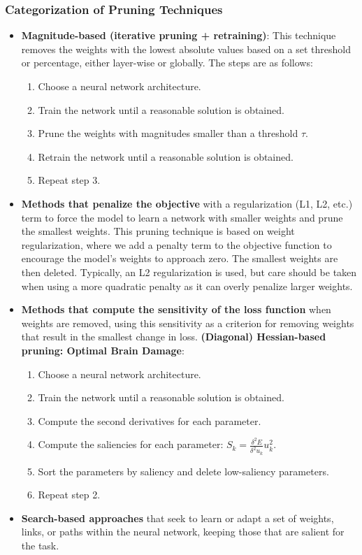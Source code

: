 \subsubsection{Categorization of Pruning Techniques}
\begin{itemize}
    \item \textbf{Magnitude-based (iterative pruning + retraining)}: This technique
          removes the weights with the lowest absolute values based on a set
          threshold or percentage, either layer-wise or globally. The steps are
          as follows:
          \begin{enumerate}
              \item Choose a neural network architecture.
              \item Train the network until a reasonable solution is obtained.
              \item Prune the weights with magnitudes smaller than a threshold $\tau$.
              \item Retrain the network until a reasonable solution is obtained.
              \item Repeat step 3.
          \end{enumerate}
    \item \textbf{Methods that penalize the objective} with a regularization
          (L1, L2, etc.) term to force the model to learn a network with smaller
          weights and prune the smallest weights. This pruning technique is based
          on weight regularization, where we add a penalty term to the objective
          function to encourage the model's weights to approach zero. The smallest
          weights are then deleted. Typically, an L2 regularization is used, but
          care should be taken when using a more quadratic penalty as it can overly
          penalize larger weights.
    \item \textbf{Methods that compute the sensitivity of the loss function} when
          weights are removed, using this sensitivity as a criterion for removing
          weights that result in the smallest change in loss. \textbf{(Diagonal)
              Hessian-based pruning: Optimal Brain Damage}:
          \begin{enumerate}
              \item Choose a neural network architecture.
              \item Train the network until a reasonable solution is obtained.
              \item Compute the second derivatives for each parameter.
              \item Compute the saliencies for each parameter: $S_k = \frac{\delta^2E}{\delta^2 u_k} u_k^2$.
              \item Sort the parameters by saliency and delete low-saliency parameters.
              \item Repeat step 2.
          \end{enumerate}
    \item \textbf{Search-based approaches} that seek to learn or adapt a set of
          weights, links, or paths within the neural network, keeping those that
          are salient for the task.
\end{itemize}

